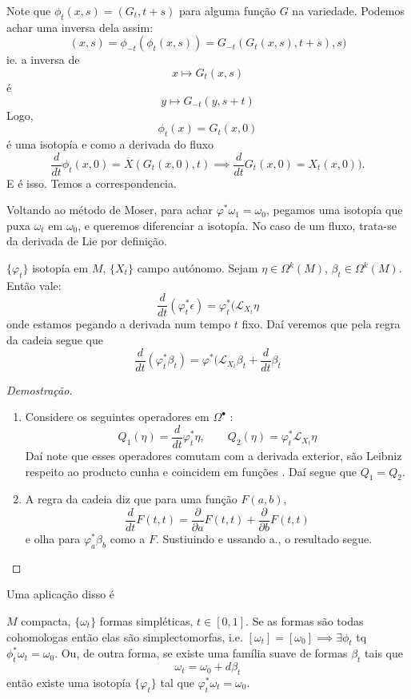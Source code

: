 Note que $\phi_t(x,s)=(G_t,t+s)$ para alguma fun\c c\~ao $G$ na variedade. Podemos achar uma inversa dela assim:
\[(x,s)=\phi_{-t}(\phi_t(x,s))=G_{-t}(G_t(x,s),t+s),s)\]
ie. a inversa de
\[x\mapsto G_t(x,s)\]
\'e
\[y\mapsto G_{-t}(y,s+t)\]
Logo, 
\[\phi_t(x)=G_t(x,0)\]
\'e uma isotop\'ia e como a derivada do fluxo
\[\frac{d}{dt}\phi_t(x,0)=\overline{X}(G_t(x,0),t)\implies \frac{d}{dt}G_t(x,0)=X_t(x,0)).\]
E \'e isso. Temos a correspondencia.

Voltando ao m\'etodo de Moser, para achar $\varphi^*\omega_1=\omega_0$, pegamos uma isotop\'ia que puxa $\omega_t$ em $\omega_0$, e queremos diferenciar a isotop\'ia. No caso de um fluxo, trata-se da derivada de Lie por defini\c c\~ao.

\begin{lemma}
	$\{\varphi_t\}$ isotop\'ia em $M$, $\{X_t\}$ campo aut\'onomo. Sejam $\eta\in\Omega^k(M)$, $\beta_t\in\Omega^k(M)$. Ent\~ao vale:
	\[\frac{d}{dt}(\varphi^*_t\epsilon)=\varphi^*_t(\mathcal{L}_{X_t}\eta\]
	onde estamos pegando a derivada num tempo $t$ fixo. Da\'i veremos que pela regra da cadeia segue que
	\[\frac{d}{dt}(\varphi^*_t\beta_t)=\varphi^* (\mathcal{L}_{X_t}\beta_t+\frac{d}{dt}\beta_t\]
\end{lemma}

\begin{proof}[Demostra\c c\~ao]
	\begin{enumerate}[label=\alph*.]
		\item Considere os seguintes operadores em $\Omega^\bullet$ :
			\[Q_1(\eta)=\frac{d}{dt}\varphi^*_t\eta,\qquad Q_2(\eta)=\varphi^*_t\mathcal{L}_{X_t}\eta\]
			Da\'i note que esses operadores comutam com a derivada exterior, s\~ao Leibniz respeito ao producto cunha e coincidem em fun\c c\~oes . Da\'i segue que $Q_1=Q_2$.

		\item A regra da cadeia diz que para uma fun\c c\~ao $F(a,b)$,
\[\frac{d}{dt}F(t,t)=\frac{\partial}{\partial a}F(t,t)+\frac{\partial}{\partial b}F(t,t)\]
e olha para $\varphi^*_a\beta_b$ como a $F$. Sustiuindo e ussando  a., o resultado segue.
	\end{enumerate}
\end{proof}

Uma aplica\c c\~ao disso \'e

\begin{thm}\leavevmode
	$M$ compacta, $\{\omega_t\}$ formas simpl\'eticas, $t\in [0,1]$. Se as formas s\~ao todas cohomologas ent\~ao elas s\~ao simplectomorfas, i.e. $[\omega_t]=[\omega_0]\implies \exists \phi_t$ tq $\phi^*_t\omega_t=\omega_0$. Ou, de outra forma, se existe uma fam\'ilia suave de formas $\beta_t$ tais que
	 \[\omega_t=\omega_0+d\beta_t\]
	 ent\~ao existe uma isotop\'ia $\{\varphi_t\}$ tal que $\varphi^*_t\omega_t=\omega_0$.
\end{thm}

